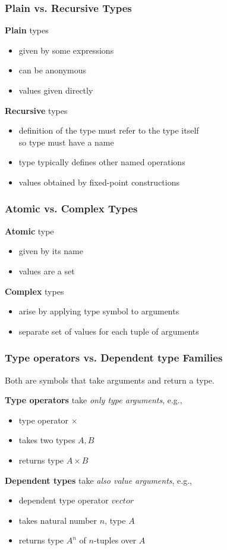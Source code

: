 \begin{frame}\frametitle{Plain vs. Recursive Types}
\textbf{Plain} types 
\begin{itemize}
\item given by some expressions
\item can be anonymous
\item values given directly
\end{itemize}

\textbf{Recursive} types
\begin{itemize}
\item definition of the type must refer to the type itself\\
so type must have a name
\item type typically defines other named operations
\item values obtained by fixed-point constructions
\end{itemize}
\end{frame}

\begin{frame}\frametitle{Atomic vs. Complex Types}
\textbf{Atomic} type
\begin{itemize}
\item given by its name
\item values are a set
\end{itemize}

\textbf{Complex} types
\begin{itemize}
\item arise by applying type symbol to arguments\\
\item separate set of values for each tuple of arguments
\end{itemize}
\end{frame}

\begin{frame}\frametitle{Type operators vs. Dependent type Families}
Both are symbols that take arguments and return a type.

\textbf{Type operators} take \emph{only type arguments}, e.g.,
 \begin{itemize}
 \item type operator $\times$
 \item takes two types $A,B$
 \item returns type $A\times B$
 \end{itemize}

\textbf{Dependent types} take \emph{also value arguments}, e.g.,
 \begin{itemize}
 \item dependent type operator $vector$
 \item takes natural number $n$, type $A$
 \item returns type $A^n$ of $n$-tuples over $A$
 \end{itemize}
\end{frame}

